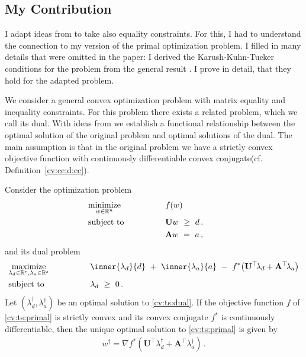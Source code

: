 \subsection*{My Contribution}
I adapt ideas from \cite{Tseng1991} to take also equality constraints. For this, I had to understand the connection to my version of the primal optimization problem. 
I filled in many details that were omitted in the paper:
I derived the Karush-Kuhn-Tucker conditions for the problem
from the general result \cite[Theorem~28.3]{Rockafellar1970}.
I prove in detail, that they hold for the adapted problem.


We consider a general convex optimization problem 
with matrix equality and inequality constraints.
For this problem there exists a related problem,
which we call its dual.
With ideas from \cite{Tseng1991} we establish 
a functional relationship
between the optimal solution of the original problem 
and
optimal solutions of the dual.
The main assumption is that in the original problem we have a strictly convex objective function 
with continuously differentiable 
convex conjugate(cf. Definition~\ref{cv:cc:d:cc}). 
\begin{ftheorem}
  \label{cv:ts:th}
  Consider the optimization problem
\begin{align}
  \label{cv:ts:primal}
    &\underset{w \in \R^n}
    {\mathrm{minimize}}
    &&\qquad\qquad
    f(w)
    &&&
    \\
    \nonumber
    &\mathrm{subject}\ \mathrm{to} 
    &&\qquad\qquad
    \mathbf{U}w
    \ 
    \ge
    \ 
    d
    \,.
    \\
    \nonumber
    &
    &&\qquad\qquad
    \mathbf{A}w
    \ 
    =
    \ 
    a
    \,,
\end{align}
and its dual problem
  \begin{alignat}{2}
    \label{cv:ts:dual}
    &\underset{
    \lambda_d \in \R^r
,
    \lambda_a \in \R^s
  }
    {\mathrm{maximize}}
    &&\qquad\qquad
    \inner
    {\lambda_d}
    {d}
    \ 
    +
    \ 
    \inner
    {\lambda_a}
    {a}
    \ 
    -
    \ 
    f^*
    \!
    \left( 
      \mathbf{U}^\top \! \lambda_d
      +
      \mathbf{A}^\top \! \lambda_a
    \right)
    \\
    \nonumber
    &\mathrm{subject}\ \mathrm{to} 
    &&\qquad\qquad
    \lambda_d
    \ 
    \ge
    \ 
    0
    \,.
\end{alignat}
  Let 
$
(\lambda_d^\dagger,\lambda_a^\dagger)
$
be an optimal solution to \eqref{cv:ts:dual}.
If the objective function $f$ of 
\eqref{cv:ts:primal} is strictly convex and its
convex conjugate $f^*$ is continuously differentiable,
then the unique optimal solution to 
\eqref{cv:ts:primal}
is given by
\begin{gather}
  w^\dagger
  =
  \nabla
    f^*
    \!
    \left( 
      \mathbf{U}^\top  \lambda_d^\dagger
      +
      \mathbf{A}^\top  \lambda_a^\dagger
    \right)
    \,.
\end{gather}
\end{ftheorem}


